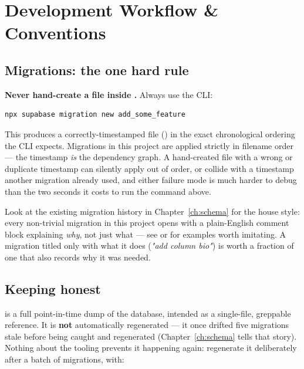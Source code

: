 \chapter{Development Workflow \& Conventions}
\label{ch:workflow}

\section{Migrations: the one hard rule}

\textbf{Never hand-create a file inside .} Always use the CLI:

\begin{lstlisting}[style=olkcodebash, language=bash, caption={Correct way to start a new migration}]
npx supabase migration new add_some_feature
\end{lstlisting}

This produces a correctly-timestamped file () in the exact chronological ordering the CLI expects. Migrations in this project are applied strictly in filename order — the timestamp \emph{is} the dependency graph. A hand-created file with a wrong or duplicate timestamp can silently apply out of order, or collide with a timestamp another migration already used, and either failure mode is much harder to debug than the two seconds it costs to run the command above.

\begin{olknote}
Look at the existing migration history in Chapter~\ref{ch:schema} for the house style: every non-trivial migration in this project opens with a plain-English comment block explaining \emph{why}, not just what — see  or  for examples worth imitating. A migration titled only with what it does (\emph{"add column bio"}) is worth a fraction of one that also records why it was needed.
\end{olknote}

\section{Keeping  honest}

 is a full point-in-time dump of the database, intended as a single-file, greppable reference. It is \textbf{not} automatically regenerated — it once drifted five migrations stale before being caught and regenerated (Chapter~\ref{ch:schema} tells that story). Nothing about the tooling prevents it happening again: regenerate it deliberately after a batch of migrations, with:

